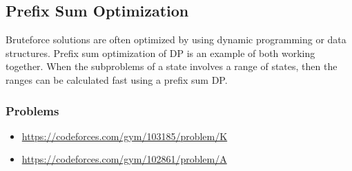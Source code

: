 \subsection{Prefix Sum Optimization}
Bruteforce solutions are often optimized by using dynamic programming or data structures. Prefix sum optimization of DP is an example of both working together. When the subproblems of a state involves a range of states, then the ranges can be calculated fast using a prefix sum DP.

\subsubsection*{Problems}
\begin{itemize}
\item \url{https://codeforces.com/gym/103185/problem/K}
\item \url{https://codeforces.com/gym/102861/problem/A}
\end{itemize}
